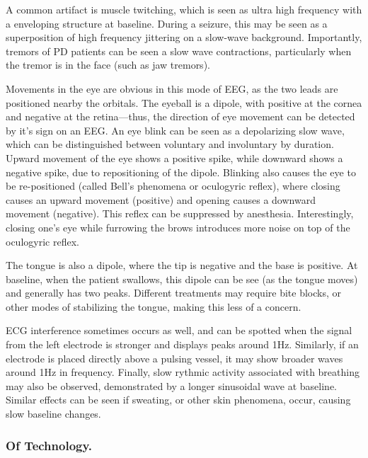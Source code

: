 A common artifact is muscle twitching, which is seen as ultra high frequency with a enveloping structure at baseline. During a seizure, this may be seen as a superposition of high frequency jittering on a slow-wave background. Importantly, tremors of PD patients can be seen a slow wave contractions, particularly when the tremor is in the face (such as jaw tremors). \newline

Movements in the eye are obvious in this mode of EEG, as the two leads are positioned nearby the orbitals. The eyeball is a dipole, with positive at the cornea and negative at the retina---thus, the direction of eye movement can be detected by it's sign on an EEG. An eye blink can be seen as a depolarizing slow wave, which can be distinguished between voluntary and involuntary by duration. Upward movement of the eye shows a positive spike, while downward shows a negative spike, due to repositioning of the dipole. Blinking also causes the eye to be re-positioned (called Bell's phenomena or oculogyric reflex), where closing causes an upward movement (positive) and opening causes a downward movement (negative). This reflex can be suppressed by anesthesia. Interestingly, closing one's eye while furrowing the brows introduces more noise on top of the oculogyric reflex.\newline

The tongue is also a dipole, where the tip is negative and the base is positive. At baseline, when the patient swallows, this dipole can be see (as the tongue moves) and generally has two peaks. Different treatments may require bite blocks, or other modes of stabilizing the tongue, making this less of a concern.\newline

ECG interference sometimes occurs as well, and can be spotted when the signal from the left electrode is stronger and displays peaks around 1Hz. Similarly, if an electrode is placed directly above a pulsing vessel, it may show broader waves around 1Hz in frequency. Finally, slow rythmic activity associated with breathing may also be observed, demonstrated by a longer sinusoidal wave at baseline. Similar effects can be seen if sweating, or other skin phenomena, occur, causing slow baseline changes. 

\subsubsection{Of Technology.}

